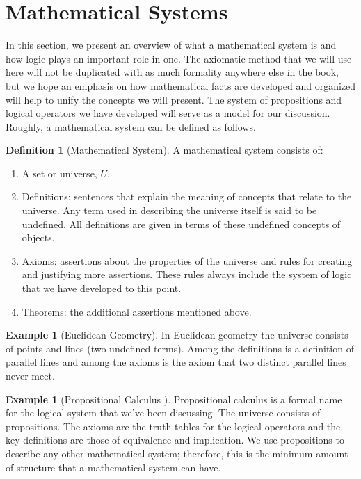 \documentclass[10pt,]{book}
\theoremstyle{plain}
\theoremstyle{definition}
\newtheorem{definition}[theorem]{Definition}
\theoremstyle{definition}
\theoremstyle{definition}
\newtheorem{example}[theorem]{Example}
\theoremstyle{definition}
\begin{document}
\par\smallskip\noindent
\typeout{************************************************}
\typeout{************************************************}
\section[Mathematical Systems]{Mathematical Systems}\label{c3s5}
In this section, we present an overview of what a mathematical system is and how logic plays an important role in one. The axiomatic method that we will use here will not be duplicated with as much formality anywhere else in the book, but we hope an emphasis on how mathematical facts are developed and organized will help to unify the concepts we will present. The system of propositions and logical operators we have developed will serve as a model for our discussion. Roughly, a mathematical system can be defined as follows.%
\begin{definition}[Mathematical System]\label{def-mathematical-system}
A mathematical system consists of:%
\par
\leavevmode%
\begin{enumerate}[label=\arabic*]
\item\hypertarget{li-105}{}A set or universe, \(U\).%
\item\hypertarget{li-106}{}Definitions: sentences that explain the meaning of concepts that relate to the universe. Any term used in describing the universe itself is said to be undefined. All definitions are given in terms of these undefined concepts of objects.%
\item\hypertarget{li-107}{}Axioms: assertions about the properties of the universe and rules for creating and justifying more assertions. These rules always include the system of logic that we have developed to this point.%
\item\hypertarget{li-108}{}Theorems: the additional assertions mentioned above.%
\end{enumerate}
%
\end{definition}
\begin{example}[Euclidean Geometry]\label{ex-euclidean-geometry}
 In Euclidean geometry the universe consists of points and lines (two undefined terms). Among the definitions is a definition of parallel lines and among the axioms is the axiom that two distinct parallel lines never meet.%
\end{example}
\begin{example}[Propositional Calculus ]\label{ex-propositional-calculus}
 Propositional calculus is a formal name for the logical system that we've been discussing. The universe consists of propositions. The axioms are the truth tables for the logical operators and the key definitions are those of equivalence and implication. We use propositions to describe any other mathematical system; therefore, this is the minimum amount of structure that a mathematical system can have.%
\end{example}
\end{document}
